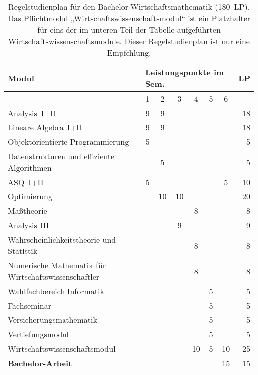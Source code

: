 \begin{table}[tbp]
    \begin{small}
    \begin{tabularx}{\textwidth}{|X||c|c|c|c|c|c||r|}\hline
        \textbf{Modul}&\multicolumn{6}{l||}{\textbf{Leistungspunkte im Sem.}}&\textbf{LP}\\\hline
        &1&2&3&4&5&6&\\\hline\hline
        Analysis~I+II&9&9&&&&&18\\\hline
        Lineare Algebra~I+II&9&9&&&&&18\\\hline
        Objektorientierte Programmierung&5&&&&&&5\\\hline
        Datenstrukturen und \newline
        effiziente Algorithmen&&5&&&&&5\\\hline
        ASQ~I+II&5&&&&&5&10\\\hline
        Optimierung&&10&10&&&&20\\\hline
        Maßtheorie&&&&8&&&8\\\hline
        Analysis III&&&9&&&&9\\\hline
        Wahrscheinlichkeitstheorie und Statistik&&&&8&&&8\\\hline
        Numerische Mathematik \newline für Wirtschaftswissenschaftler&&&&8&&&8\\\hline
        Wahlfachbereich Informatik&&&&&5&&5\\\hline
        Fachseminar&&&&&5&&5\\\hline
        Versicherungsmathematik&&&&&5&&5\\\hline
        Vertiefungsmodul&&&&&5&&5\\\hline
        Wirtschaftswissenschaftsmodul&&&&10&5&10&25\\\hline
        \textbf{Bachelor-Arbeit}&&&&&&15&15\\\hline\hline
    \end{tabularx}
    \end{small}
    \caption{\label{plan-wima}Regelstudienplan für den Bachelor Wirtschaftsmathematik (180~LP). Das Pflichtmodul „Wirtschaftswissenschaftsmodul“ ist ein Platzhalter für eins der im unteren Teil der Tabelle aufgeführten Wirtschaftswissenschaftsmodule. Dieser Regelstudienplan ist nur eine Empfehlung.}
\end{table}





